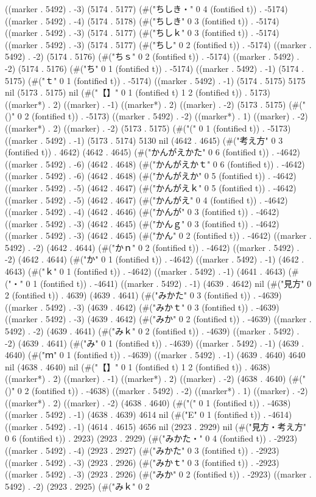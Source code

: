 ((marker . 5492) . -3) (5174 . 5177) (#("ちしき・" 0 4 (fontified t)) . -5174) ((marker . 5492) . -4) (5174 . 5178) (#("ちしき" 0 3 (fontified t)) . -5174) ((marker . 5492) . -3) (5174 . 5177) (#("ちしｋ" 0 3 (fontified t)) . -5174) ((marker . 5492) . -3) (5174 . 5177) (#("ちし" 0 2 (fontified t)) . -5174) ((marker . 5492) . -2) (5174 . 5176) (#("ちｓ" 0 2 (fontified t)) . -5174) ((marker . 5492) . -2) (5174 . 5176) (#("ち" 0 1 (fontified t)) . -5174) ((marker . 5492) . -1) (5174 . 5175) (#("ｔ" 0 1 (fontified t)) . -5174) ((marker . 5492) . -1) (5174 . 5175) 5175 nil (5173 . 5175) nil (#("【】" 0 1 (fontified t) 1 2 (fontified t)) . 5173) ((marker*) . 2) ((marker) . -1) ((marker*) . 2) ((marker) . -2) (5173 . 5175) (#("()" 0 2 (fontified t)) . -5173) ((marker . 5492) . -2) ((marker*) . 1) ((marker) . -2) ((marker*) . 2) ((marker) . -2) (5173 . 5175) (#("(" 0 1 (fontified t)) . -5173) ((marker . 5492) . -1) (5173 . 5174) 5130 nil (4642 . 4645) (#("考え方" 0 3 (fontified t)) . 4642) (4642 . 4645) (#("かんがえかた" 0 6 (fontified t)) . -4642) ((marker . 5492) . -6) (4642 . 4648) (#("かんがえかｔ" 0 6 (fontified t)) . -4642) ((marker . 5492) . -6) (4642 . 4648) (#("かんがえか" 0 5 (fontified t)) . -4642) ((marker . 5492) . -5) (4642 . 4647) (#("かんがえｋ" 0 5 (fontified t)) . -4642) ((marker . 5492) . -5) (4642 . 4647) (#("かんがえ" 0 4 (fontified t)) . -4642) ((marker . 5492) . -4) (4642 . 4646) (#("かんが" 0 3 (fontified t)) . -4642) ((marker . 5492) . -3) (4642 . 4645) (#("かんｇ" 0 3 (fontified t)) . -4642) ((marker . 5492) . -3) (4642 . 4645) (#("かん" 0 2 (fontified t)) . -4642) ((marker . 5492) . -2) (4642 . 4644) (#("かｎ" 0 2 (fontified t)) . -4642) ((marker . 5492) . -2) (4642 . 4644) (#("か" 0 1 (fontified t)) . -4642) ((marker . 5492) . -1) (4642 . 4643) (#("ｋ" 0 1 (fontified t)) . -4642) ((marker . 5492) . -1) (4641 . 4643) (#("・" 0 1 (fontified t)) . -4641) ((marker . 5492) . -1) (4639 . 4642) nil (#("見方" 0 2 (fontified t)) . 4639) (4639 . 4641) (#("みかた" 0 3 (fontified t)) . -4639) ((marker . 5492) . -3) (4639 . 4642) (#("みかｔ" 0 3 (fontified t)) . -4639) ((marker . 5492) . -3) (4639 . 4642) (#("みか" 0 2 (fontified t)) . -4639) ((marker . 5492) . -2) (4639 . 4641) (#("みｋ" 0 2 (fontified t)) . -4639) ((marker . 5492) . -2) (4639 . 4641) (#("み" 0 1 (fontified t)) . -4639) ((marker . 5492) . -1) (4639 . 4640) (#("ｍ" 0 1 (fontified t)) . -4639) ((marker . 5492) . -1) (4639 . 4640) 4640 nil (4638 . 4640) nil (#("【】" 0 1 (fontified t) 1 2 (fontified t)) . 4638) ((marker*) . 2) ((marker) . -1) ((marker*) . 2) ((marker) . -2) (4638 . 4640) (#("()" 0 2 (fontified t)) . -4638) ((marker . 5492) . -2) ((marker*) . 1) ((marker) . -2) ((marker*) . 2) ((marker) . -2) (4638 . 4640) (#("(" 0 1 (fontified t)) . -4638) ((marker . 5492) . -1) (4638 . 4639) 4614 nil (#("E" 0 1 (fontified t)) . -4614) ((marker . 5492) . -1) (4614 . 4615) 4656 nil (2923 . 2929) nil (#("見方・考え方" 0 6 (fontified t)) . 2923) (2923 . 2929) (#("みかた・" 0 4 (fontified t)) . -2923) ((marker . 5492) . -4) (2923 . 2927) (#("みかた" 0 3 (fontified t)) . -2923) ((marker . 5492) . -3) (2923 . 2926) (#("みかｔ" 0 3 (fontified t)) . -2923) ((marker . 5492) . -3) (2923 . 2926) (#("みか" 0 2 (fontified t)) . -2923) ((marker . 5492) . -2) (2923 . 2925) (#("みｋ" 0 2 
